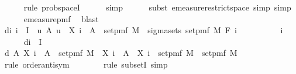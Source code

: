 \begin{isabellebody}
\ \ \ \ \isamarkupfalse%
\ {\isacharparenleft}{\kern0pt}rule\ prob{\isacharunderscore}{\kern0pt}spaceI{\isacharparenright}{\kern0pt}\isanewline
\ \ \ \ \isamarkupfalse%
\ simp\isanewline
\ \ \ \ \isamarkupfalse%
\ {\isacharparenleft}{\kern0pt}subst\ emeasure{\isacharunderscore}{\kern0pt}restrict{\isacharunderscore}{\kern0pt}space{\isacharcomma}{\kern0pt}\ simp{\isacharcomma}{\kern0pt}\ simp{\isacharparenright}{\kern0pt}\isanewline
\ \ \ \ \isamarkupfalse%
\ emeasure{\isacharunderscore}{\kern0pt}pmf\ \isamarkupfalse%
\ blast\isanewline
\isanewline
\ \ \isamarkupfalse%
\ d{\isacharcolon}{\kern0pt}{\isachardoublequoteopen}{\isasymAnd}i{\isachardot}{\kern0pt}\ i\ {\isasymin}\ I\ {\isasymLongrightarrow}\ {\isacharbraceleft}{\kern0pt}u{\isachardot}{\kern0pt}\ {\isasymexists}A{\isachardot}{\kern0pt}\ u\ {\isacharequal}{\kern0pt}\ X\ i\ {\isacharminus}{\kern0pt}{\isacharbackquote}{\kern0pt}\ A\ {\isasyminter}\ set{\isacharunderscore}{\kern0pt}pmf\ M{\isacharbraceright}{\kern0pt}\ {\isacharequal}{\kern0pt}\ sigma{\isacharunderscore}{\kern0pt}sets\ {\isacharparenleft}{\kern0pt}set{\isacharunderscore}{\kern0pt}pmf\ M{\isacharparenright}{\kern0pt}\ {\isacharparenleft}{\kern0pt}F\ i{\isacharparenright}{\kern0pt}{\isachardoublequoteclose}\isanewline
\ \ \isamarkupfalse%
\ {\isacharminus}{\kern0pt}\isanewline
\ \ \ \ \isamarkupfalse%
\ i\isanewline
\ \ \ \ \isamarkupfalse%
\ d{}{\isacharcolon}{\kern0pt}{\isachardoublequoteopen}i\ {\isasymin}\ I{\isachardoublequoteclose}\isanewline
\ \ \ \ \isamarkupfalse%
\ d{}{\isacharcolon}{\kern0pt}\ {\isachardoublequoteopen}{\isasymAnd}A{\isachardot}{\kern0pt}\ X\ i\ {\isacharminus}{\kern0pt}{\isacharbackquote}{\kern0pt}\ A\ {\isasyminter}\ set{\isacharunderscore}{\kern0pt}pmf\ M\ {\isacharequal}{\kern0pt}\ X\ i\ {\isacharminus}{\kern0pt}{\isacharbackquote}{\kern0pt}\ {\isacharparenleft}{\kern0pt}A\ {\isasyminter}\ X\ i\ {\isacharbackquote}{\kern0pt}\ set{\isacharunderscore}{\kern0pt}pmf\ M{\isacharparenright}{\kern0pt}\ {\isasyminter}\ set{\isacharunderscore}{\kern0pt}pmf\ M{\isachardoublequoteclose}\isanewline
\ \ \ \ \ \ \isamarkupfalse%
\ {\isacharparenleft}{\kern0pt}rule\ order{\isacharunderscore}{\kern0pt}antisym{\isacharparenright}{\kern0pt}\isanewline
\ \ \ \ \ \ \isamarkupfalse%
\ {\isacharparenleft}{\kern0pt}rule\ subsetI{\isacharcomma}{\kern0pt}\ simp{\isacharparenright}{\kern0pt}{\isacharplus}{\kern0pt}\isanewline

\end{isabellebody}
